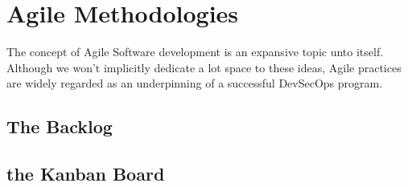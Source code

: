\section{Agile Methodologies}

\justify
The concept of Agile Software development is an expansive topic
unto itself. Although we won't implicitly dedicate a lot space to these
ideas, Agile practices are widely regarded as an underpinning of a successful
DevSecOps program.

\subsection{The Backlog}

\subsection{the Kanban Board}
